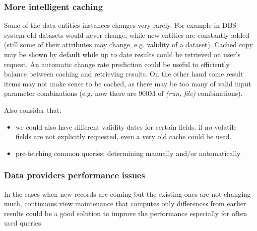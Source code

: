 
\subsubsection*{More intelligent caching}
Some of the data entities instances changes very rarely. For example in DBS system old datasets would never change, while new entities are constantly added (still some of their attributes may change, e.g.  validity of a dataset). 
%
Cached copy may be shown by default while up to date results could be retrieved on user's request. An automatic change rate prediction could be useful to efficiently balance between caching and retrieving results.
%
On the other hand some result items may not make sense to be cached, as there may be too many of valid input parameter combinations (e.g. now there are 900M of \textit{(run, file)} combinations).

Also consider that:
                			\begin{itemize}
                			\item we could also have different validity dates for certain fields. if no volatile fields are not explicitly requested, even a very old cache could be used. 
                			\item pre-fetching common queries: determining manually and/or automatically
                			\end{itemize}





\subsubsection*{Data providers performance issues}
In the cases when new records are coming but the existing ones are not changing much, continuous view maintenance that computes only differences from earlier results could be a good solution to improve the performance especially for often used queries. 

